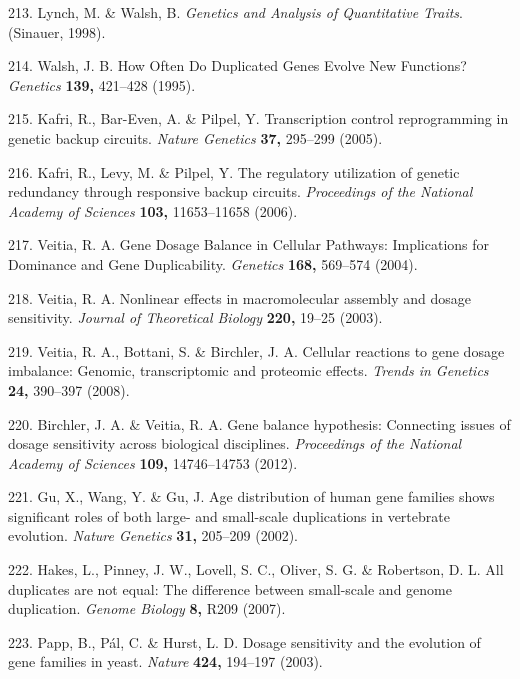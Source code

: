 \documentclass[12pt,]{book}
\begin{document}
\hypertarget{ref-lynch_genetics_1998}{}
213. Lynch, M. \& Walsh, B. \emph{Genetics and Analysis of Quantitative
Traits}. (Sinauer, 1998).

\hypertarget{ref-walsh_how_1995}{}
214. Walsh, J. B. How Often Do Duplicated Genes Evolve New Functions?
\emph{Genetics} \textbf{139,} 421--428 (1995).

\hypertarget{ref-kafri_transcription_2005}{}
215. Kafri, R., Bar-Even, A. \& Pilpel, Y. Transcription control
reprogramming in genetic backup circuits. \emph{Nature Genetics}
\textbf{37,} 295--299 (2005).

\hypertarget{ref-kafri_regulatory_2006}{}
216. Kafri, R., Levy, M. \& Pilpel, Y. The regulatory utilization of
genetic redundancy through responsive backup circuits. \emph{Proceedings
of the National Academy of Sciences} \textbf{103,} 11653--11658 (2006).

\hypertarget{ref-veitia_gene_2004}{}
217. Veitia, R. A. Gene Dosage Balance in Cellular Pathways:
Implications for Dominance and Gene Duplicability. \emph{Genetics}
\textbf{168,} 569--574 (2004).

\hypertarget{ref-veitia_nonlinear_2003}{}
218. Veitia, R. A. Nonlinear effects in macromolecular assembly and
dosage sensitivity. \emph{Journal of Theoretical Biology} \textbf{220,}
19--25 (2003).

\hypertarget{ref-veitia_cellular_2008}{}
219. Veitia, R. A., Bottani, S. \& Birchler, J. A. Cellular reactions to
gene dosage imbalance: Genomic, transcriptomic and proteomic effects.
\emph{Trends in Genetics} \textbf{24,} 390--397 (2008).

\hypertarget{ref-birchler_gene_2012}{}
220. Birchler, J. A. \& Veitia, R. A. Gene balance hypothesis:
Connecting issues of dosage sensitivity across biological disciplines.
\emph{Proceedings of the National Academy of Sciences} \textbf{109,}
14746--14753 (2012).

\hypertarget{ref-gu_age_2002}{}
221. Gu, X., Wang, Y. \& Gu, J. Age distribution of human gene families
shows significant roles of both large- and small-scale duplications in
vertebrate evolution. \emph{Nature Genetics} \textbf{31,} 205--209
(2002).

\hypertarget{ref-hakes_all_2007}{}
222. Hakes, L., Pinney, J. W., Lovell, S. C., Oliver, S. G. \&
Robertson, D. L. All duplicates are not equal: The difference between
small-scale and genome duplication. \emph{Genome Biology} \textbf{8,}
R209 (2007).

\hypertarget{ref-papp_dosage_2003}{}
223. Papp, B., Pál, C. \& Hurst, L. D. Dosage sensitivity and the
evolution of gene families in yeast. \emph{Nature} \textbf{424,}
194--197 (2003).
\end{document}
